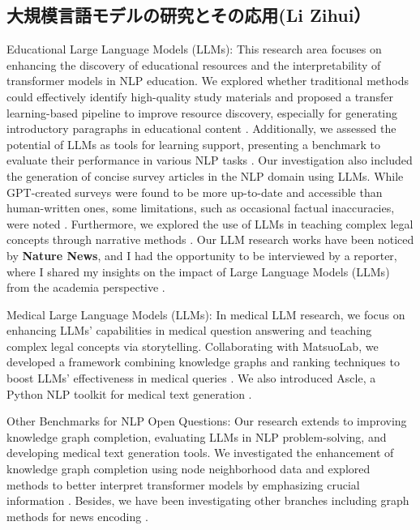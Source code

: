 \subsection{大規模言語モデルの研究とその応用(Li Zihui）}

Educational Large Language Models (LLMs): This research area focuses on enhancing the discovery of educational resources and the interpretability of transformer models in NLP education. We explored whether traditional methods could effectively identify high-quality study materials and proposed a transfer learning-based pipeline to improve resource discovery, especially for generating introductory paragraphs in educational content \cite{ireneli-3,ireneli-9}. Additionally, we assessed the potential of LLMs as tools for learning support, presenting a benchmark to evaluate their performance in various NLP tasks \cite{ireneli-5}. Our investigation also included the generation of concise survey articles in the NLP domain using LLMs. While GPT-created surveys were found to be more up-to-date and accessible than human-written ones, some limitations, such as occasional factual inaccuracies, were noted \cite{ireneli-11}. Furthermore, we explored the use of LLMs in teaching complex legal concepts through narrative methods \cite{ireneli-8}. Our LLM research works \cite{ireneli-1} have been noticed by \textbf{Nature News}, and I had the opportunity to be interviewed by a reporter, where I shared my insights on the impact of Large Language Models (LLMs) from the academia perspective \cite{ireneli-13}.

Medical Large Language Models (LLMs): In medical LLM research, we focus on enhancing LLMs' capabilities in medical question answering and teaching complex legal concepts via storytelling. Collaborating with MatsuoLab, we developed a framework combining knowledge graphs and ranking techniques to boost LLMs' effectiveness in medical queries \cite{ireneli-7}. We also introduced Ascle, a Python NLP toolkit for medical text generation \cite{ireneli-10}.

Other Benchmarks for NLP Open Questions: Our research extends to improving knowledge graph completion, evaluating LLMs in NLP problem-solving, and developing medical text generation tools. We investigated the enhancement of knowledge graph completion using node neighborhood data \cite{ireneli-4} and explored methods to better interpret transformer models by emphasizing crucial information \cite{ireneli-6}. Besides, we have been investigating other branches including graph methods for news encoding \cite{ireneli-2,ireneli-12}.


